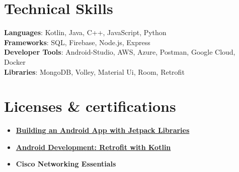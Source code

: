 \documentclass[letterpaper,11pt]{article}
\newcommand{\resumeItem}[1]{
  \item\small{
    {#1 \vspace{-2pt}}
  }
}
\newcommand{\resumeItemListStart}{\begin{itemize}}
\newcommand{\resumeItemListEnd}{\end{itemize}\vspace{-5pt}}
\begin{document}
\section{\textbf{Technical Skills}}
 \begin{itemize}[leftmargin=0.15in, label={}]
    \small{\item{
     \textbf{Languages}{: Kotlin, Java, C++, JavaScript, Python} \\
     \textbf{Frameworks}{: SQL, Firebase, Node.js, Express  } \\
     \textbf{Developer Tools}{: Android-Studio, AWS, Azure, Postman, Google Cloud, Docker } \\
     \textbf{Libraries}{: MongoDB, Volley, Material Ui, Room, Retrofit  }
    }} 
 \end{itemize}
   
\section{\textbf{Licenses \& certifications}}
 \begin{itemize}[leftmargin=0.15in, label={}]
    \small{\item{
        \resumeItemListStart
                \resumeItem{\textbf{\href{https://www.linkedin.com/learning/certificates/0678a1527860b8e6ba5694ca1c73c5bab5c3463b8bb5d6c3b9a1fcc19be38ce9}{Building an Android App with Jetpack Libraries}}}
                \resumeItem{\textbf{\href{https://www.linkedin.com/learning/certificates/0f804705fc3f345406c7a7ccdc10ec244d4384268e86e94bc5eafd52f67755d0}{Android Development: Retrofit with Kotlin}}} 

                \resumeItem{\textbf{{Cisco Networking Essentials}}}
                \newline
      \resumeItemListEnd
    }}
 \end{itemize}
    
\end{document}
